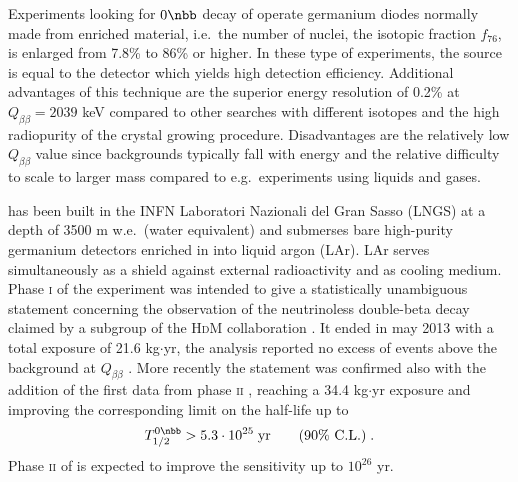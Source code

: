 Experiments looking for $0\nbb$ decay of  operate germanium diodes normally made from enriched material, i.e.~the number of  nuclei, the isotopic fraction $f_{76}$, is enlarged from 7.8\% to 86\% or higher. In these type of experiments, the source is equal to the detector which yields high detection efficiency. Additional advantages of this technique are the superior energy resolution of 0.2\% at $Q_{\beta\beta}=2039$ keV compared to other searches with different isotopes and the high radiopurity of the crystal growing procedure. Disadvantages are the relatively low $Q_{\beta\beta}$ value since backgrounds typically fall with energy and the relative difficulty to scale to larger mass compared to e.g.~experiments using liquids and gases.

{\gerda} has been built in the INFN Laboratori Nazionali del Gran Sasso (LNGS) at a depth of 3500 m w.e.~(water equivalent) and submerses bare high-purity germanium detectors enriched in  into liquid argon (LAr). LAr serves simultaneously as a shield against external radioactivity and as cooling medium. Phase \textsc{i} of the experiment was intended to give a statistically unambiguous statement concerning the observation of the neutrinoless double-beta decay claimed by a subgroup of the \textsc{HdM} collaboration \cite{hdmclaim}. It ended in may 2013 with a total exposure of 21.6 kg$\cdot$yr, the analysis reported no excess of events above the background at $Q_{\beta\beta}$ \cite{resultsphase1}. More recently the statement was confirmed also with the addition of the first data from phase \textsc{ii} \cite{nature}, reaching a 34.4 kg$\cdot$yr exposure and improving the corresponding limit on the half-life up to
\begin{equation}T_{1/2}^{0\nbb}>5.3\cdot10^{25}\;\text{yr}\qquad\text{(90\% C.L.)}\;.\end{equation}
Phase \textsc{ii} of {\gerda} is expected to improve the sensitivity up to $10^{26}$ yr.

